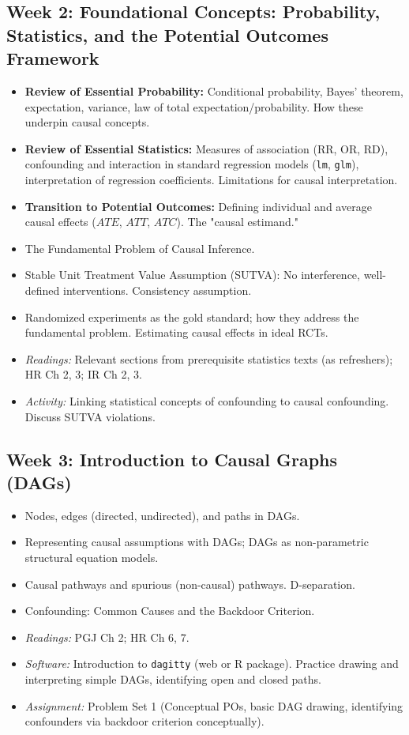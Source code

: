 \documentclass[10.5pt]{article}
\begin{document}
\subsection*{Week 2: Foundational Concepts: Probability, Statistics, and the Potential Outcomes Framework}
\begin{itemize}
    \item \textbf{Review of Essential Probability:} Conditional probability, Bayes' theorem, expectation, variance, law of total expectation/probability. How these underpin causal concepts.
    \item \textbf{Review of Essential Statistics:} Measures of association (RR, OR, RD), confounding and interaction in standard regression models (\texttt{lm}, \texttt{glm}), interpretation of regression coefficients. Limitations for causal interpretation.
    \item \textbf{Transition to Potential Outcomes:} Defining individual and average causal effects ($ATE$, $ATT$, $ATC$). The "causal estimand."
    \item The Fundamental Problem of Causal Inference.
    \item Stable Unit Treatment Value Assumption (SUTVA): No interference, well-defined interventions. Consistency assumption.
    \item Randomized experiments as the gold standard; how they address the fundamental problem. Estimating causal effects in ideal RCTs.
    \item \textit{Readings:} Relevant sections from prerequisite statistics texts (as refreshers); HR Ch 2, 3; IR Ch 2, 3.
    \item \textit{Activity:} Linking statistical concepts of confounding to causal confounding. Discuss SUTVA violations.
\end{itemize}

\subsection*{Week 3: Introduction to Causal Graphs (DAGs)}
\begin{itemize}
    \item Nodes, edges (directed, undirected), and paths in DAGs.
    \item Representing causal assumptions with DAGs; DAGs as non-parametric structural equation models.
    \item Causal pathways and spurious (non-causal) pathways. D-separation.
    \item Confounding: Common Causes and the Backdoor Criterion.
    \item \textit{Readings:} PGJ Ch 2; HR Ch 6, 7.
    \item \textit{Software:} Introduction to \texttt{dagitty} (web or R package). Practice drawing and interpreting simple DAGs, identifying open and closed paths.
    \item \textit{Assignment:} Problem Set 1 (Conceptual POs, basic DAG drawing, identifying confounders via backdoor criterion conceptually).
\end{itemize}
\end{document}
